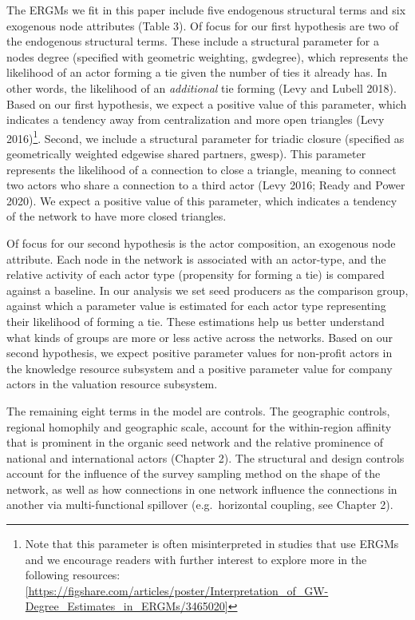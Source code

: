 \documentclass[twoside,12pt,final]{ucthesis-CA2012}
\begin{document}
\begin{ucmainmatter}
The ERGMs we fit in this paper include five endogenous structural terms
and six exogenous node attributes (Table 3). Of focus for our first
hypothesis are two of the endogenous structural terms. These include a
structural parameter for a node\textquotesingle s degree (specified with geometric
weighting, \textquotesingle gwdegree\textquotesingle), which represents the likelihood of an actor
forming a tie given the number of ties it already has. In other words,
the likelihood of an \emph{additional} tie forming (Levy and Lubell 2018).
Based on our first hypothesis, we expect a positive value of this
parameter, which indicates a tendency away from centralization and more
open triangles (Levy 2016)\footnote{Note that this parameter is often misinterpreted in studies that
  use ERGMs and we encourage readers with further interest to explore
  more in the following resources:
  \href{https://figshare.com/articles/poster/Interpretation_of_GW-Degree_Estimates_in_ERGMs/3465020}{{[}https://figshare.com/articles/poster/Interpretation\_of\_GW-Degree\_Estimates\_in\_ERGMs/3465020{]}}}. Second, we include a structural
parameter for \textquotesingle triadic closure\textquotesingle{} (specified as geometrically weighted
edgewise shared partners, \textquotesingle gwesp\textquotesingle). This parameter represents the
likelihood of a connection to close a triangle, meaning to connect two
actors who share a connection to a third actor (Levy 2016; Ready and
Power 2020). We expect a positive value of this parameter, which
indicates a tendency of the network to have more closed triangles.

Of focus for our second hypothesis is the actor composition, an
exogenous node attribute. Each node in the network is associated with an
actor-type, and the relative activity of each actor type (propensity for
forming a tie) is compared against a baseline. In our analysis we set
seed producers as the comparison group, against which a parameter value
is estimated for each actor type representing their likelihood of
forming a tie. These estimations help us better understand what kinds of
groups are more or less active across the networks. Based on our second
hypothesis, we expect positive parameter values for non-profit actors in
the knowledge resource subsystem and a positive parameter value for
company actors in the valuation resource subsystem.

The remaining eight terms in the model are controls. The geographic
controls, regional homophily and geographic scale, account for the
within-region affinity that is prominent in the organic seed network and
the relative prominence of national and international actors (Chapter
2). The structural and design controls account for the influence of the
survey sampling method on the shape of the network, as well as how
connections in one network influence the connections in another via
multi-functional spillover (e.g.~horizontal coupling, see Chapter 2).


\end{ucmainmatter}
\end{document}
